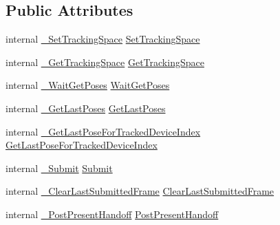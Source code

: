 \subsection*{Public Attributes}
\begin{DoxyCompactItemize}
\item 
internal \mbox{\hyperlink{struct_valve_1_1_v_r_1_1_i_v_r_compositor_a8f3a63140b76c144825aef005d57b9a7}{\+\_\+\+Set\+Tracking\+Space}} \mbox{\hyperlink{struct_valve_1_1_v_r_1_1_i_v_r_compositor_a7d12544c3a7ff539b520c1ff4941aba5}{Set\+Tracking\+Space}}
\item 
internal \mbox{\hyperlink{struct_valve_1_1_v_r_1_1_i_v_r_compositor_a4a4568c4dfcd60444a4ab3b7bf47a019}{\+\_\+\+Get\+Tracking\+Space}} \mbox{\hyperlink{struct_valve_1_1_v_r_1_1_i_v_r_compositor_a66d7b3f8b2d98b50b94a7b6723593ab0}{Get\+Tracking\+Space}}
\item 
internal \mbox{\hyperlink{struct_valve_1_1_v_r_1_1_i_v_r_compositor_a526e58af311d731d5802cb0d3736f7de}{\+\_\+\+Wait\+Get\+Poses}} \mbox{\hyperlink{struct_valve_1_1_v_r_1_1_i_v_r_compositor_a6506c136d5242a72d1cab500c8e81edb}{Wait\+Get\+Poses}}
\item 
internal \mbox{\hyperlink{struct_valve_1_1_v_r_1_1_i_v_r_compositor_ab8dca04ae79b8aa27b29fb0a87260240}{\+\_\+\+Get\+Last\+Poses}} \mbox{\hyperlink{struct_valve_1_1_v_r_1_1_i_v_r_compositor_a42be7eeaea139f04df7260a6f74791a3}{Get\+Last\+Poses}}
\item 
internal \mbox{\hyperlink{struct_valve_1_1_v_r_1_1_i_v_r_compositor_a707d9c738e4eb3162086a2b14bca3c70}{\+\_\+\+Get\+Last\+Pose\+For\+Tracked\+Device\+Index}} \mbox{\hyperlink{struct_valve_1_1_v_r_1_1_i_v_r_compositor_a6fbed9f7ac57e65727afe7d867883c12}{Get\+Last\+Pose\+For\+Tracked\+Device\+Index}}
\item 
internal \mbox{\hyperlink{struct_valve_1_1_v_r_1_1_i_v_r_compositor_a1422994a772786e464dde9703ca9bd7f}{\+\_\+\+Submit}} \mbox{\hyperlink{struct_valve_1_1_v_r_1_1_i_v_r_compositor_abe6d8cca56250c7520eb5680b59726e0}{Submit}}
\item 
internal \mbox{\hyperlink{struct_valve_1_1_v_r_1_1_i_v_r_compositor_a24bbc59100ce60397cba42d396d7b51c}{\+\_\+\+Clear\+Last\+Submitted\+Frame}} \mbox{\hyperlink{struct_valve_1_1_v_r_1_1_i_v_r_compositor_a4ccb6191c65b45e6f39671ec913a5620}{Clear\+Last\+Submitted\+Frame}}
\item 
internal \mbox{\hyperlink{struct_valve_1_1_v_r_1_1_i_v_r_compositor_a1897063eebdbc1ee4d4ae821a6d584cc}{\+\_\+\+Post\+Present\+Handoff}} \mbox{\hyperlink{struct_valve_1_1_v_r_1_1_i_v_r_compositor_aac1c3ee99b666cd9f38872f510d45161}{Post\+Present\+Handoff}}

\end{DoxyCompactItemize}

